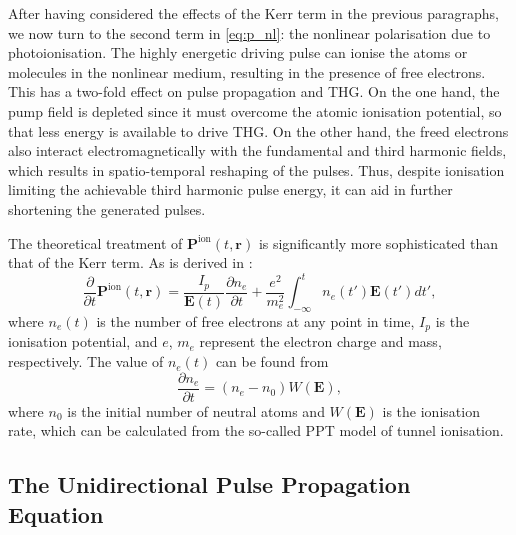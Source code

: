 \documentclass[a4paper]{jpconf}
\begin{document}
After having considered the effects of the Kerr term in the previous paragraphs, we now turn to the second term in \eqref{eq:p_nl}: the nonlinear polarisation due to photoionisation. The highly energetic driving pulse can ionise the atoms or molecules in the nonlinear medium, resulting in the presence of free electrons. This has a two-fold effect on pulse propagation and THG. On the one hand, the pump field is depleted since it must overcome the atomic ionisation potential, so that less energy is available to drive THG. On the other hand, the freed electrons also interact electromagnetically with the fundamental and third harmonic fields, which results in spatio-temporal reshaping of the pulses. Thus, despite ionisation limiting the achievable third harmonic pulse energy, it can aid in further shortening the generated pulses. \par 
The theoretical treatment of $\mathbf{P}^\text{ion}(t, \mathbf{r})$ is significantly more sophisticated than that of the Kerr term. As is derived in \cite{geissler1999}:
\begin{equation}\label{eq:p_ion}
\frac{\partial}{\partial t} \mathbf{P}^\text{ion}(t, \mathbf{r}) = \frac{I_p}{\mathbf{E}(t)} \frac{\partial n_e}{\partial t} + \frac{e^2}{m_e^2} \int_{-\infty}^t n_e(t') \mathbf{E}(t')dt',
\end{equation} 
where $n_e(t)$ is the number of free electrons at any point in time, $I_p$ is the ionisation potential, and $e$, $m_e$ represent the electron charge and mass, respectively. The value of $n_e(t)$ can be found from 
\begin{equation}
\frac{\partial n_e}{\partial t} = (n_e - n_0) W(\mathbf{E}),
\end{equation}
where $n_0$ is the initial number of neutral atoms and $W(\mathbf{E})$ is the ionisation rate, which can be calculated from the so-called PPT model of tunnel ionisation. 

\subsection{The Unidirectional Pulse Propagation Equation}
\end{document}
